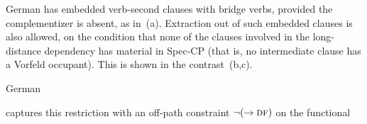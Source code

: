 \documentclass[output=paper,hidelinks]{langscibook}
\begin{document}
German has embedded verb-second clauses with bridge verbs, provided the
complementizer is absent, as in~(a). Extraction out of such
embedded clauses is also allowed, on the condition that none of the
clauses involved in the long-distance dependency has material in
Spec-CP (that is, no intermediate clause has a Vorfeld occupant). This is shown in the
contrast~(b,c).
%
\begin{exe}
  \ex German \citep[b,c from][§6.2.4, examples 23, 24]{Berman2003}
  \begin{xlist}
  \end{xlist}
\end{exe}
%
\citeauthor{Berman2003} captures this restriction with an off-path constraint \mbox{$\neg(\rightarrow\textsc{df}{})$} on the functional
\end{document}
